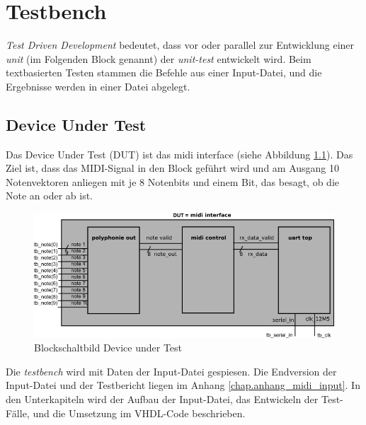 
\chapter{Testbench}\label{chap.testen}
 \textit{Test Driven Development} bedeutet, dass vor oder parallel zur Entwicklung einer \textit{unit} (im Folgenden Block genannt) der \textit{unit-test} entwickelt wird\cite{Testdriven}. Beim textbasierten Testen stammen die Befehle aus einer Input-Datei, und die Ergebnisse werden in einer Datei abgelegt. 

\section{Device Under Test}\label{sec.testbench_DUT}
Das Device Under Test (DUT) ist das midi interface (siehe Abbildung \ref{fig.testbench}). Das Ziel ist, dass das MIDI-Signal in den Block geführt wird und am Ausgang 10 Notenvektoren anliegen mit je 8 Notenbits und einem Bit, das besagt, ob die Note an oder ab ist.\\
\begin{figure}[H]
	\includegraphics[width=1\textwidth]{images/midi_interface/testbench_midiinterface.png}
	\caption{Blockschaltbild Device under Test}
	\label{fig.testbench}
\end{figure} 

Die \textit{testbench} wird mit Daten der Input-Datei gespiesen. Die Endversion der Input-Datei und der Testbericht liegen im Anhang \ref{chap.anhang_midi_input}. 
In den Unterkapiteln wird der Aufbau der Input-Datei, das Entwickeln der Test-Fälle, und die Umsetzung im VHDL-Code beschrieben.


